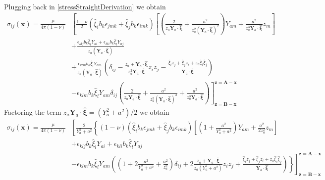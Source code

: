 \documentclass[10pt]{report}
\begin{document}
{Plugging back in \eqref{stressStraightDerivation} we obtain
\begin{align}
\sigma_{ij}(\bm x)
=\frac{\mu}{4\pi(1-\nu)}&\left[\frac{1-\nu}{2}\left(\hat{\xi}_ib_k\epsilon_{jmk}+\hat{\xi}_jb_k\epsilon_{imk}\right)\left[\left(\frac{2}{z_a\bm Y_a\cdot \hat{\bm \xi}}+\frac{a^2}{z_a^2(\bm Y_a\cdot \hat{\bm \xi})^2}\right)Y_{am}+\frac{a^2}{z_a^3 \bm Y_a\cdot \hat{\bm \xi}}z_m\right]\right.\nonumber\\
&+\frac{\epsilon_{klj}b_k\hat{\xi}_lY_{ai}+\epsilon_{kli}b_k\hat{\xi}_lY_{aj}}{z_a(\bm Y_a\cdot \hat{\bm \xi})}\nonumber\\
&+\frac{\epsilon_{klm}b_k\hat{\xi}_lY_{am}}{z_a(\bm Y_a\cdot \hat{\bm \xi})}\left(\delta_{ij}-\frac{z_a+\bm Y_a\cdot \hat{\bm \xi}}{z_a^2\bm Y_a\cdot \hat{\bm \xi}}z_iz_j-\frac{\hat{\xi}_iz_j+\hat{\xi}_jz_i+z_a\hat{\xi}_i\hat{\xi}_j}{\bm Y_a\cdot \hat{\bm \xi}}\right)\nonumber\\
&\left.-\epsilon_{klm}b_k\hat{\xi}_lY_{am}\delta_{ij}\left(\frac{2}{z_a\bm Y_a\cdot \hat{\bm \xi}}+\frac{a^2}{z_a^2(\bm Y_a\cdot \hat{\bm \xi})^2}+\frac{a^2}{z_a^3 \bm Y_a\cdot \hat{\bm \xi}}\right)\right]^{\bm z=\bm A-\bm x}_{\bm z=\bm B-\bm x}
\end{align}
Factoring the term $z_a\bm Y_a\cdot \hat{\bm \xi}=(Y_a^2+a^2)/2$ we obtain
\begin{align}
\sigma_{ij}(\bm x)
=\frac{\mu}{4\pi(1-\nu)}&\left[\frac{2}{Y_a^2+a^2}\left\{(1-\nu)\left(\hat{\xi}_ib_k\epsilon_{jmk}+\hat{\xi}_jb_k\epsilon_{imk}\right)\left[\left(1+\frac{a^2}{Y_a^2+a^2}\right)Y_{am}+\frac{a^2}{2z_a^2 }z_m\right]\right.\right.\nonumber\\
&+\epsilon_{klj}b_k\hat{\xi}_lY_{ai}+\epsilon_{kli}b_k\hat{\xi}_lY_{aj}\nonumber\\
&\left.\left.-\epsilon_{klm}b_k\hat{\xi}_lY_{am}\left(\left(1+2\frac{a^2}{Y_a^2+a^2}+\frac{a^2}{z_a^2 }\right)\delta_{ij}+2\frac{z_a+\bm Y_a\cdot \hat{\bm \xi}}{z_a(Y_a^2+a^2)}z_iz_j+\frac{\hat{\xi}_iz_j+\hat{\xi}_jz_i+z_a\hat{\xi}_i\hat{\xi}_j}{\bm Y_a\cdot \hat{\bm \xi}}\right)
\right\}\right]^{\bm z=\bm A-\bm x}_{\bm z=\bm B-\bm x}
%
\end{align}


}
\end{document}
